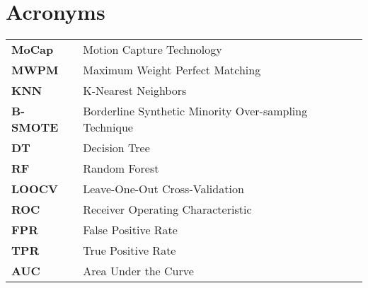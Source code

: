 \section*{\Huge Acronyms}

\begin{table}[H]
    \begin{tabular}{l l} 
        \textbf{MoCap} & Motion Capture Technology \\
        \textbf{MWPM} & Maximum Weight Perfect Matching \\
        \textbf{KNN} & K-Nearest Neighbors \\
        \textbf{B-SMOTE} & Borderline Synthetic Minority Over-sampling Technique \\
        \textbf{DT} & Decision Tree \\
        \textbf{RF} & Random Forest \\
        \textbf{LOOCV} & Leave-One-Out Cross-Validation \\
        \textbf{ROC} & Receiver Operating Characteristic \\
        \textbf{FPR} & False Positive Rate \\
        \textbf{TPR} & True Positive Rate \\
        \textbf{AUC} & Area Under the Curve \\
    \end{tabular}
\end{table}
